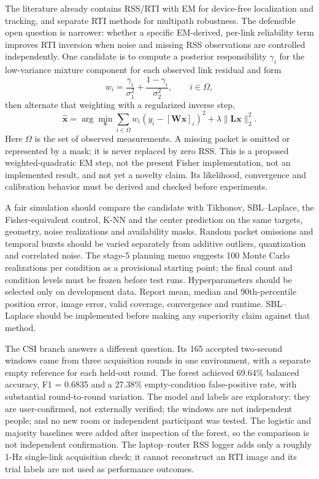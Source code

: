 \documentclass[sensors,article,submit,oneauthor]{Definitions/mdpi}
\begin{document}
The literature already contains RSS/RTI with EM for device-free localization and tracking, and separate RTI methods for multipath robustness. The defensible open question is narrower: whether a specific EM-derived, per-link reliability term improves RTI inversion when noise and missing RSS observations are controlled independently. One candidate is to compute a posterior responsibility $\gamma_i$ for the low-variance mixture component for each observed link residual and form
\begin{equation}
w_i = \frac{\gamma_i}{\sigma_1^2}+\frac{1-\gamma_i}{\sigma_2^2}, \qquad i\in\Omega,
\end{equation}
then alternate that weighting with a regularized inverse step,
\begin{equation}
\widehat{\mathbf{x}}=\arg\min_{\mathbf{x}}\sum_{i\in\Omega}w_i\left(y_i-[\mathbf{W}\mathbf{x}]_i\right)^2+\lambda\lVert\mathbf{L}\mathbf{x}\rVert_2^2.
\end{equation}
Here $\Omega$ is the set of observed measurements. A missing packet is omitted or represented by a mask; it is never replaced by zero RSS. This is a proposed weighted-quadratic EM step, not the present Fisher implementation, not an implemented result, and not yet a novelty claim. Its likelihood, convergence and calibration behavior must be derived and checked before experiments.

A fair simulation should compare the candidate with Tikhonov, SBL--Laplace, the Fisher-equivalent control, K-NN and the center prediction on the same targets, geometry, noise realizations and availability masks. Random packet omissions and temporal bursts should be varied separately from additive outliers, quantization and correlated noise. The stage-5 planning memo suggests 100 Monte Carlo realizations per condition as a provisional starting point; the final count and condition levels must be frozen before test runs. Hyperparameters should be selected only on development data. Report mean, median and 90th-percentile position error, image error, valid coverage, convergence and runtime. SBL--Laplace should be implemented before making any superiority claim against that method.

The CSI branch answers a different question. Its 165 accepted two-second windows came from three acquisition rounds in one environment, with a separate empty reference for each held-out round. The forest achieved 69.64\% balanced accuracy, F1 = 0.6835 and a 27.38\% empty-condition false-positive rate, with substantial round-to-round variation. The model and labels are exploratory: they are user-confirmed, not externally verified; the windows are not independent people; and no new room or independent participant was tested. The logistic and majority baselines were added after inspection of the forest, so the comparison is not independent confirmation. The laptop--router RSS logger adds only a roughly 1-Hz single-link acquisition check; it cannot reconstruct an RTI image and its trial labels are not used as performance outcomes.
\end{document}
